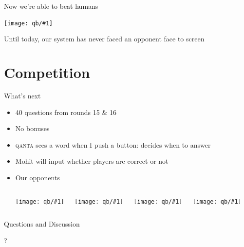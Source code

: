 \documentclass[compress]{beamer}
\newcommand{\gfxq}[2]{
\begin{center}
	\texttt{[image: qb/\#1]}
\end{center}
}
\begin{document}
\begin{frame}{Now we're able to beat humans}

  \gfxq{human_history}{1.0}
  \pause
  
 Until today, our system has never faced an opponent face to screen

\end{frame}


\section{Competition}

\begin{frame}{What's next}

	\begin{itemize}
		\item 40 questions from rounds 15 \& 16
		\item No bonuses
		\item \textsc{qanta} sees a word when I push a button: decides when to answer
		\item Mohit will input whether players are correct or not
		\pause
		\item Our opponents
		\begin{columns}
				\gfxq{colby_jeo}{1.0}
				\gfxq{ben_jeo}{1.0}
				\gfxq{alex_jeo}{1.0}
				\gfxq{kristin_jeo}{1.0}						
		\end{columns}
	\end{itemize}

\end{frame}

\begin{frame}{Questions and Discussion}

	\begin{center}
	\begin{Huge}
	?
	\end{Huge}
	\end{center}

\end{frame}
\end{document}
